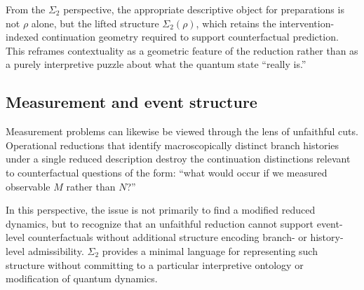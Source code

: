 From the $\Sigma_2$ perspective, the appropriate descriptive object for preparations is not $\rho$
alone, but the lifted structure $\Sigma_2(\rho)$, which retains the intervention-indexed
continuation geometry required to support counterfactual prediction. This reframes contextuality
as a geometric feature of the reduction rather than as a purely interpretive puzzle about what the
quantum state ``really is.''

\subsection{Measurement and event structure}

Measurement problems can likewise be viewed through the lens of unfaithful cuts. Operational
reductions that identify macroscopically distinct branch histories under a single reduced
description destroy the continuation distinctions relevant to counterfactual questions of the
form: ``what would occur if we measured observable $M$ rather than $N$?''

In this perspective, the issue is not primarily to find a modified reduced dynamics, but to
recognize that an unfaithful reduction cannot support event-level counterfactuals without
additional structure encoding branch- or history-level admissibility. $\Sigma_2$ provides a
minimal language for representing such structure without committing to a particular interpretive
ontology or modification of quantum dynamics.